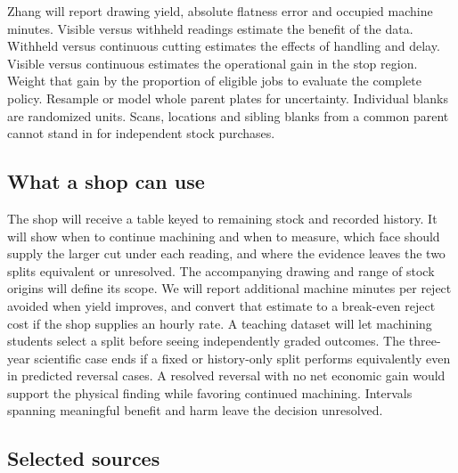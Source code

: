 \documentclass[11pt,letterpaper]{article}
\begin{document}
Zhang will report drawing yield, absolute flatness error and occupied machine minutes. Visible versus withheld readings estimate the benefit of the data. Withheld versus continuous cutting estimates the effects of handling and delay. Visible versus continuous estimates the operational gain in the stop region. Weight that gain by the proportion of eligible jobs to evaluate the complete policy. Resample or model whole parent plates for uncertainty. Individual blanks are randomized units. Scans, locations and sibling blanks from a common parent cannot stand in for independent stock purchases.

\subsection*{What a shop can use}

The shop will receive a table keyed to remaining stock and recorded history. It will show when to continue machining and when to measure, which face should supply the larger cut under each reading, and where the evidence leaves the two splits equivalent or unresolved. The accompanying drawing and range of stock origins will define its scope. We will report additional machine minutes per reject avoided when yield improves, and convert that estimate to a break-even reject cost if the shop supplies an hourly rate. A teaching dataset will let machining students select a split before seeing independently graded outcomes. The three-year scientific case ends if a fixed or history-only split performs equivalently even in predicted reversal cases. A resolved reversal with no net economic gain would support the physical finding while favoring continued machining. Intervals spanning meaningful benefit and harm leave the decision unresolved.

\subsection*{Selected sources}
\end{document}
